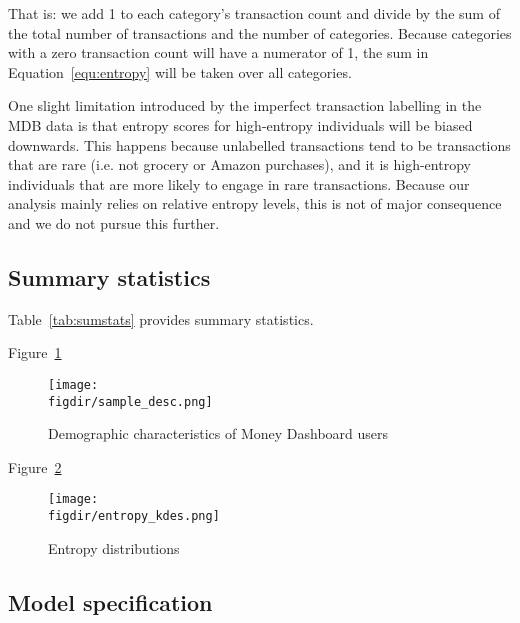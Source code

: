 That is: we add 1 to each category's transaction count and divide by the sum of
the total number of transactions and the number of categories. Because
categories with a zero transaction count will have a numerator of 1, the sum in
Equation~\ref{equ:entropy} will be taken over all categories.

One slight limitation introduced by the imperfect transaction labelling in the
MDB data is that entropy scores for high-entropy individuals will be biased
downwards. This happens because unlabelled transactions tend to be transactions
that are rare (i.e. not grocery or Amazon purchases), and it is high-entropy
individuals that are more likely to engage in rare transactions. Because our
analysis mainly relies on relative entropy levels, this is not of major
consequence and we do not pursue this further.


\subsection{Summary statistics}%
\label{par:summary_statistics}

Table~\ref{tab:sumstats} provides summary statistics.



Figure~\ref{fig:sample_desc}
\begin{figure}[H]
    \caption{Demographic characteristics of Money Dashboard users}
    \label{fig:sample_desc}
    \begin{center}
        \texttt{[image: \\figdir/sample\_desc.png]}
    \end{center}
\end{figure}

Figure~\ref{fig:entropy_kdes}
\begin{figure}[H]
    \center \newcommand\width{\textwidth} \caption{Entropy distributions}
    \label{fig:entropy_kdes}
    \texttt{[image: \\figdir/entropy\_kdes.png]}
    \fignote{\width}{}
\end{figure}


\subsection{Model specification}%
\label{par:model_specification}

